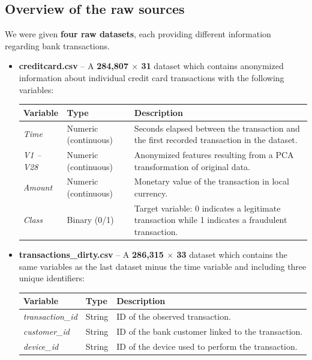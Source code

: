 \documentclass[12pt]{report} %
\begin{document}
\subsection{Overview of the raw sources}
We were given \textbf{four raw datasets}, each providing different information regarding bank transactions. 
\begin{itemize}
    \item \textbf{creditcard.csv} – A \textbf{284,807 $\times$ 31} dataset which contains anonymized information 
    about individual credit card transactions with the following variables:

    \begin{center}
    \begin{tabular}{|l|l|p{8cm}|}
        \hline
        \textbf{Variable} & \textbf{Type} & \textbf{Description} \\
        \hline
        \textit{Time} & Numeric (continuous) & Seconds elapsed between the transaction and the first recorded transaction in the dataset. \\
        \hline
        \textit{V1 -- V28} & Numeric (continuous) & Anonymized features resulting from a PCA transformation of original data. \\
        \hline
        \textit{Amount} & Numeric (continuous) & Monetary value of the transaction in local currency. \\
        \hline
        \textit{Class} & Binary (0/1) & Target variable: 0 indicates a legitimate transaction while 1 indicates a fraudulent transaction. \\
        \hline
    \end{tabular}
    \end{center}

    \item \textbf{transactions\_dirty.csv} – A \textbf{286,315 $\times$ 33} dataset which contains the same variables 
    as the last dataset minus the time variable and including three unique identifiers:

    \begin{center}
    \begin{tabular}{|l|l|p{8cm}|}
        \hline
        \textbf{Variable} & \textbf{Type} & \textbf{Description} \\
        \hline
        \textit{transaction\_id} & String & ID of the observed transaction. \\
        \hline
        \textit{customer\_id} & String & ID of the bank customer linked to the transaction. \\
        \hline
        \textit{device\_id} & String & ID of the device used to perform the transaction. \\
        \hline
    \end{tabular}
    \end{center}


\end{itemize}
\end{document}
